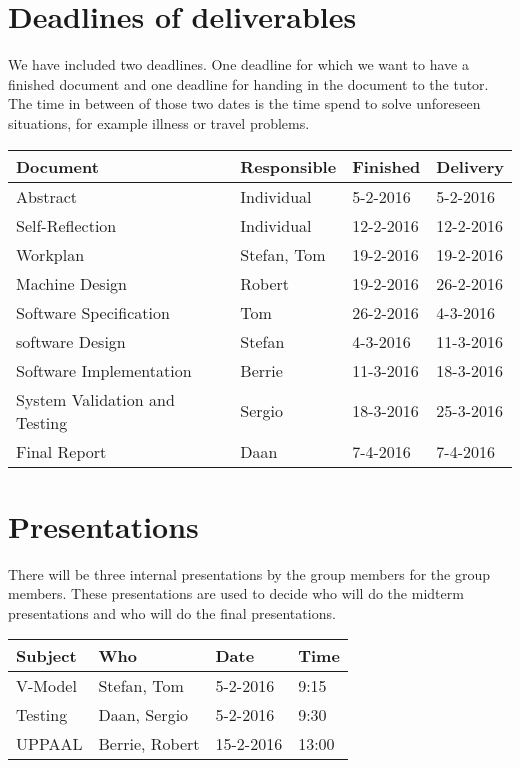\documentclass[a4paper,oneside,11pt]{article}
\begin{document}
\section{Deadlines of deliverables}
We have included two deadlines. One deadline for which we want to have a finished document and one deadline for handing in the document to the tutor. The time in between of those two dates is the time spend to solve unforeseen situations, for example illness or travel problems.\\
\begin{center}
\begin{tabular}{|l|l|l|l|}
\hline
Document & Responsible & Finished & Delivery\\
\hline
Abstract & Individual & 5-2-2016 & 5-2-2016\\
\hline
Self-Reflection & Individual & 12-2-2016 & 12-2-2016\\
\hline
Workplan & Stefan, Tom & 19-2-2016 & 19-2-2016\\
\hline
Machine Design & Robert & 19-2-2016 & 26-2-2016\\
\hline
Software Specification & Tom & 26-2-2016 & 4-3-2016\\
\hline
software Design & Stefan & 4-3-2016 & 11-3-2016\\
\hline
Software Implementation & Berrie & 11-3-2016 & 18-3-2016\\
\hline
System Validation and Testing & Sergio & 18-3-2016 & 25-3-2016\\
\hline
Final Report & Daan & 7-4-2016 & 7-4-2016\\
\hline
\end{tabular}
\end{center}

\section{Presentations}
There will be three internal presentations by the group members for the group members. These presentations are used to decide who will do the midterm presentations and who will do the final presentations.\\
\begin{center}
\begin{tabular}{|l|l|l|l|}
\hline
Subject & Who & Date & Time\\
\hline
V-Model & Stefan, Tom & 5-2-2016 & 9:15\\
\hline
Testing & Daan, Sergio & 5-2-2016 & 9:30\\
\hline
UPPAAL & Berrie, Robert & 15-2-2016 & 13:00\\
\hline
\end{tabular}
\end{center}
\end{document}

